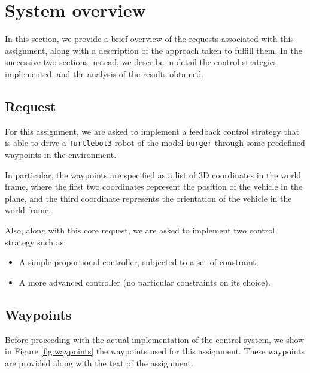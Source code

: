 \section{System overview}
\label{sec:system_overview}

In this section, we provide a brief overview of the requests associated with this assignment, along with a description of the approach taken to fulfill them.
In the successive two sections instead, we describe in detail the control strategies implemented, and the analysis of the results obtained.

\subsection{Request}
\label{subsec:request}

For this assignment, we are asked to implement a feedback control strategy that is able to drive a \texttt{Turtlebot3} robot of the model \texttt{burger} through some predefined waypoints in the environment.

In particular, the waypoints are specified as a list of 3D coordinates in the world frame, where the first two coordinates represent the position of the vehicle in the plane, and the third coordinate represents the orientation of the vehicle in the world frame.

Also, along with this core request, we are asked to implement two control strategy such as:

\begin{itemize}
    \item A simple proportional controller, subjected to a set of constraint;
    \item A more advanced controller (no particular constraints on its choice).
\end{itemize}



\subsection{Waypoints}
\label{subsec:waypoints}

Before proceeding with the actual implementation of the control system, we show in Figure \ref{fig:waypoints} the waypoints used for this assignment.
These waypoints are provided along with the text of the assignment.

